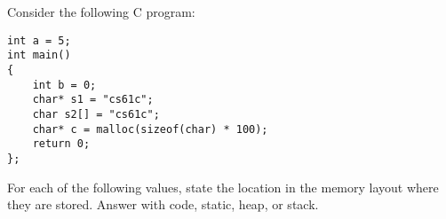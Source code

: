 \begin{blocksection}
\question
Consider the following C program:

\begin{verbatim}
int a = 5;
int main()
{
    int b = 0;
    char* s1 = "cs61c";
    char s2[] = "cs61c";
    char* c = malloc(sizeof(char) * 100);
    return 0;
};
\end{verbatim}

For each of the following values, state the location in the memory layout where they are stored. Answer with code, static, heap, or stack.

\end{blocksection}